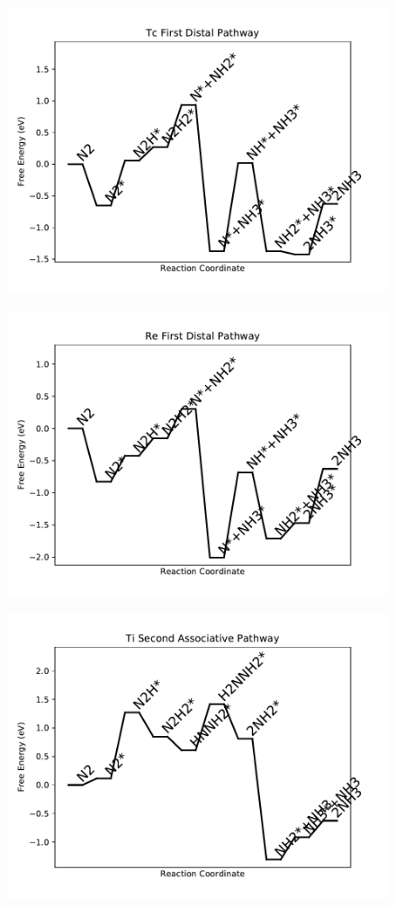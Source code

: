 \begin{figure}
\includegraphics[width=0.8\linewidth]{data/plots/Tc_distal_1.pdf}
\end{figure}

\begin{figure}
\includegraphics[width=0.8\linewidth]{data/plots/Re_distal_1.pdf}
\end{figure}

\begin{figure}
\includegraphics[width=0.8\linewidth]{data/plots/Ti_associative_2.pdf}
\end{figure}

